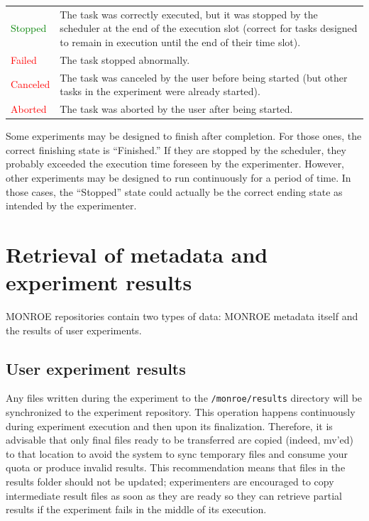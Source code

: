 \documentclass[a4paper,10pt]{article}
\newcommand{\monroe}{MONROE}
\newcommand{\identifier}[1]{{\texttt{\small{#1}}}}
\begin{document}
\begin{table}[tp]
\begin{center}
\begin{tabular*}{1\textwidth}{p{}p{}}
			\textcolor{green}{Stopped} & The task was correctly executed, but it was stopped by the scheduler at the end of the execution slot (correct for tasks designed to remain in execution until the end of their time slot).\\
			\textcolor{red}{Failed} & The task stopped abnormally.\\
			\textcolor{red}{Canceled} & The task was canceled by the user before being started (but other tasks in the experiment were already started).\\
			\textcolor{red}{Aborted} & The task was aborted by the user after being started.\\
			\bottomrule
		\end{tabular*}
	\end{center}
\end {table}

Some experiments may be designed to finish after completion.
For those ones, the correct finishing state is ``Finished.''
If they are stopped by the scheduler, they probably exceeded the execution time foreseen by the experimenter.
However, other experiments may be designed to run continuously for a period of time.
In those cases, the ``Stopped'' state could actually be the correct ending state as intended by the experimenter.


\section{Retrieval of metadata and experiment results}
\label{sec:resultRetrieval}

\monroe{} repositories contain two types of data: \monroe{} metadata itself and the results of user experiments.

\subsection{User experiment results}

Any files written during the experiment to the \identifier{/monroe/results} directory will be synchronized to the experiment repository.
This operation happens continuously during experiment execution and then upon its finalization.
Therefore, it is advisable that only final files ready to be transferred are copied (indeed, mv'ed) to that location to avoid the system to sync temporary files and consume your quota or produce invalid results.
This recommendation means that files in the results folder should not be updated; experimenters are encouraged to copy intermediate result files as soon as they are ready so they can retrieve partial results if the experiment fails in the middle of its execution.
\end{document}
